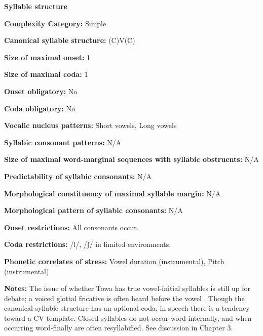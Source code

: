 \textbf{Syllable structure}



\textbf{Complexity Category:} Simple



\textbf{Canonical syllable structure:} (C)V(C) \citep[21-22]{Yumitani1998}



\textbf{Size of maximal onset:} 1



\textbf{Size of maximal coda:} 1



\textbf{Onset obligatory:} No



\textbf{Coda obligatory:} No



\textbf{Vocalic nucleus patterns:} Short vowels, Long vowels



\textbf{Syllabic consonant patterns:} N/A



\textbf{Size of maximal word{}-marginal sequences with syllabic obstruents:} N/A



\textbf{Predictability of syllabic consonants:} N/A



\textbf{Morphological constituency of maximal syllable margin:} N/A



\textbf{Morphological pattern of syllabic consonants:} N/A



\textbf{Onset restrictions:} All consonants occur.



\textbf{Coda restrictions:} /l/, /ʃ/ in limited environments.



\textbf{Phonetic correlates of stress:} Vowel duration (instrumental), Pitch (instrumental)



\textbf{Notes:} The issue of whether Towa has true vowel-initial syllables is still up for debate; a voiced glottal fricative is often heard before the vowel \citep[22-23]{Yumitani1998}. Though the canonical syllable structure has an optional coda, in speech there is a tendency toward a CV template. Closed syllables do not occur word-internally, and when occurring word-finally are often resyllabified. See discussion in Chapter 3.




